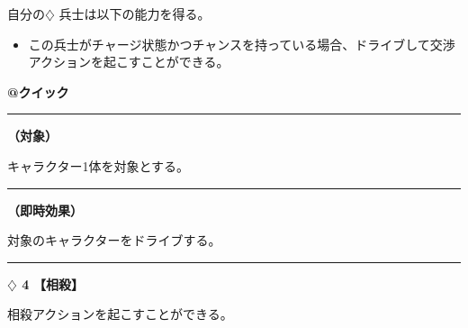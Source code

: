 \documentclass[twocolumn,a5paper,papersize,10pt]{jarticle}
\begin{document}
自分の{\normalsize $\diamondsuit$} 兵士は以下の能力を得る。


\vspace{-1zh}%
\begin{itemize}
\setlength{\leftskip}{-0.3cm}
\setlength{\parskip}{0pt} %

\item この兵士がチャージ状態かつチャンスを持っている場合、ドライブして交渉アクションを起こすことができる。
\vspace{-1zh}%
\end{itemize}

\begin{tcolorbox}[title={\small\bf【Action】交渉}{\scriptsize （兵士起因）}]

{\scriptsize\bf @クイック }

\vspace{1mm} %
\hrule height 0.1mm depth 0mm width 62mm %
\vspace{1mm} %

{\bf（対象）}

キャラクター1体を対象とする。

\vspace{1mm} %
\hrule height 0.1mm depth 0mm width 62mm %
\vspace{1mm} %

{\bf（即時効果）}

対象のキャラクターをドライブする。

\vspace{1mm} %
\end{tcolorbox}

\vspace{-1zh}

 
 
 
 
 

\vspace{3mm} %
\hrule height 0.5mm depth 0mm width 66.5mm %
\vspace{1mm} %
{\Large\bf $\diamondsuit$ 4} {\normalsize\bf【相殺】} %
\vspace{1mm} %

相殺アクションを起こすことができる。
\end{document}
